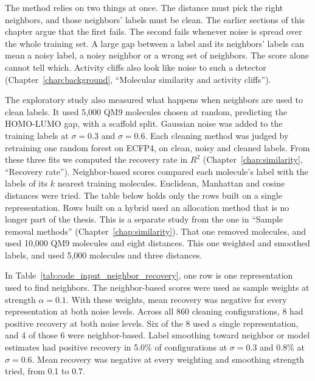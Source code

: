 The method relies on two things at once. The distance must pick the right neighbors, and those neighbors' labels must be clean. The earlier sections of this chapter argue that the first fails. The second fails whenever noise is spread over the whole training set. A large gap between a label and its neighbors' labels can mean a noisy label, a noisy neighbor or a wrong set of neighbors. The score alone cannot tell which. Activity cliffs also look like noise to such a detector (Chapter~\ref{chap:background}, ``Molecular similarity and activity cliffs'').

The exploratory study also measured what happens when neighbors are used to clean labels. It used 5,000 QM9 molecules chosen at random, predicting the HOMO-LUMO gap, with a scaffold split. Gaussian noise was added to the training labels at $\sigma = 0.3$ and $\sigma = 0.6$. Each cleaning method was judged by retraining one random forest on ECFP4, on clean, noisy and cleaned labels. From these three fits we computed the recovery rate in $R^2$ (Chapter~\ref{chap:similarity}, ``Recovery rate''). Neighbor-based scores compared each molecule's label with the labels of its $k$ nearest training molecules. Euclidean, Manhattan and cosine distances were tried. The table below holds only the rows built on a single representation. Rows built on a hybrid used an allocation method that is no longer part of the thesis. This is a separate study from the one in ``Sample removal methods'' (Chapter~\ref{chap:similarity}). That one removed molecules, and used 10,000 QM9 molecules and eight distances. This one weighted and smoothed labels, and used 5,000 molecules and three distances.

In Table~\ref{tab:code_input_neighbor_recovery}, one row is one representation used to find neighbors. The neighbor-based scores were used as sample weights at strength $\alpha = 0.1$. With these weights, mean recovery was negative for every representation at both noise levels. Across all 860 cleaning configurations, 8 had positive recovery at both noise levels. Six of the 8 used a single representation, and 4 of those 6 were neighbor-based. Label smoothing toward neighbor or model estimates had positive recovery in 5.0\% of configurations at $\sigma = 0.3$ and 0.8\% at $\sigma = 0.6$. Mean recovery was negative at every weighting and smoothing strength tried, from 0.1 to 0.7.


